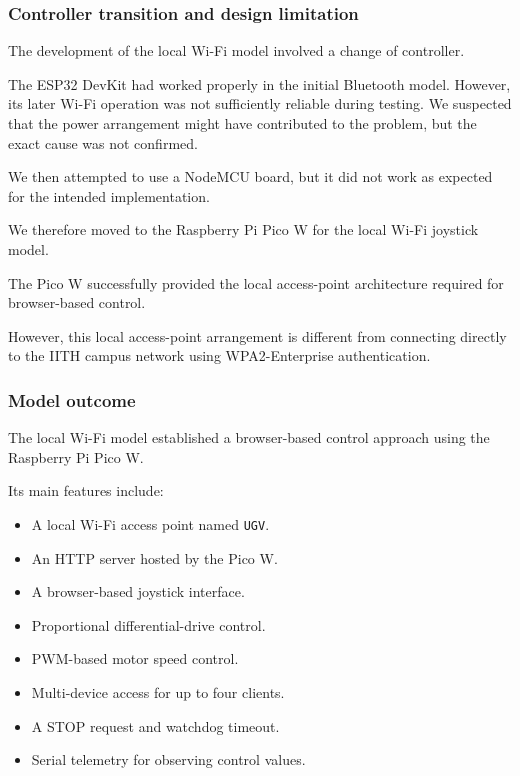 \documentclass[11pt,a4paper]{article}
\begin{document}
\subsubsection{Controller transition and design limitation}

The development of the local Wi-Fi model involved
a change of controller.

The ESP32 DevKit had worked properly in the initial
Bluetooth model. However, its later Wi-Fi operation
was not sufficiently reliable during testing.
We suspected that the power arrangement might
have contributed to the problem, but the exact
cause was not confirmed.

We then attempted to use a NodeMCU board, but
it did not work as expected for the intended
implementation.

We therefore moved to the Raspberry Pi Pico W
for the local Wi-Fi joystick model.

The Pico W successfully provided the local
access-point architecture required for
browser-based control.

However, this local access-point arrangement
is different from connecting directly to the
IITH campus network using WPA2-Enterprise
authentication.


\subsubsection{Model outcome}

The local Wi-Fi model established a browser-based
control approach using the Raspberry Pi Pico W.

Its main features include:

\begin{itemize}
    \item A local Wi-Fi access point named \texttt{UGV}.
    \item An HTTP server hosted by the Pico W.
    \item A browser-based joystick interface.
    \item Proportional differential-drive control.
    \item PWM-based motor speed control.
    \item Multi-device access for up to four clients.
    \item A STOP request and watchdog timeout.
    \item Serial telemetry for observing control values.
\end{itemize}
\end{document}
